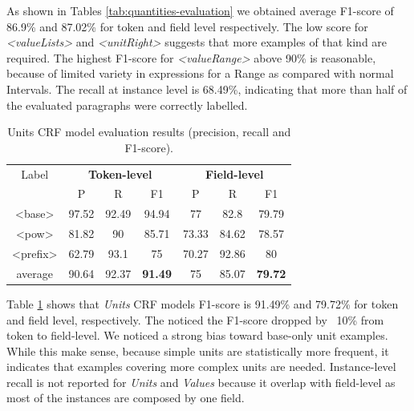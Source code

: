 \documentclass[sigconf]{acmart}
\begin{document}
As shown in Tables \ref{tab:quantities-evaluation} we obtained average F1-score of 86.9\% and 87.02\% for token and field level respectively. The low score for \textit{<valueLists>} and \textit{<unitRight>} suggests that more examples of that kind are required. The highest F1-score for \textit{<valueRange>} above 90\% is reasonable, because of limited variety in expressions for a Range as compared with normal Intervals. 
The recall at instance level is 68.49\%, indicating that more than half of the evaluated paragraphs were correctly labelled.  

\begin{table}[ht]
    \caption{Units CRF model evaluation results (precision, recall and F1-score).}
    \label{tab:units-evaluation}
    \begin{tabular}{c|ccc|ccc}
        \toprule
        Label & \multicolumn{3}{c}{\textbf{Token-level}} & \multicolumn{3}{c}{\textbf{Field-level}}\\
        & P & R & F1 & P & R & F1 \\
        \midrule
        <base>    & 97.52 & 92.49 & 94.94 & 77    & 82.8  & 79.79 \\
        <pow>     & 81.82 & 90    & 85.71 & 73.33 & 84.62 & 78.57 \\
        <prefix>  & 62.79 & 93.1  & 75    & 70.27 & 92.86 & 80    \\
        \midrule
        average   & 90.64  & 92.37 & \textbf{91.49} & 75   & 85.07 & \textbf{79.72} \\
        \bottomrule
   \end{tabular}
\end{table}

Table \ref{tab:units-evaluation} shows that \textit{Units} CRF models F1-score is 91.49\% and 79.72\% for token and field level, respectively. The noticed the F1-score dropped by ~10\% from token to field-level. We noticed a strong bias toward base-only unit examples. While this make sense, because simple units are statistically more frequent, it indicates that examples covering more complex units are needed. Instance-level recall is not reported for \textit{Units} and \textit{Values} because it overlap with field-level as most of the instances are composed by one field. 
\end{document}
